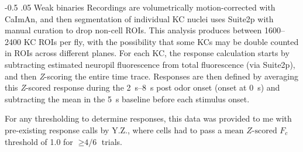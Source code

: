 \documentclass[12pt]{caltech_thesis}
\makeatletter
\let\Oldsubsubsection\subsubsection
\renewcommand{\subsubsection}{\FloatBarrier\Oldsubsubsection}
\renewcommand\paragraph{%
    \@startsection{paragraph}{4}{0mm}%
       {-0.5\baselineskip}%
       {.05\baselineskip}%
       {\normalfont\normalsize\itshape}}
\renewcommand\subsubsection{%
    \@startsection{subsubsection}{4}{0mm}%
       {-0.5\baselineskip}%
       {.05\baselineskip}%
       {\normalfont\normalsize\bfseries\itshape}}
\newcommand{\KCRespStat}{\ensuremath{\text{mean }\mathit{Z}\text{-scored $F_c$}}}
\makeatother
\begin{document}
\begin{refsection}
\paragraph{Weak binaries}
Recordings are volumetrically motion-corrected with CaImAn, and then segmentation of individual KC nuclei uses Suite2p with manual curation to drop non-cell ROIs.
This analysis produces between \numrange{1600}{2400} KC ROIs per fly, with the possibility that some KCs may be double counted in ROIs across different planes.
For each KC, the response calculation starts by subtracting estimated neuropil fluorescence from total fluorescence (via Suite2p), and then \textit{Z}-scoring the entire time trace.
Responses are then defined by averaging this \textit{Z}-scored response during the \qtyrange{2}{8}{\second} post odor onset (onset at \qty{0}{\second}) and subtracting the mean in the \qty{5}{\second} baseline before each stimulus onset.

For any thresholding to determine responses, this data was provided to me with pre-existing response calls by Y.Z., where cells had to pass a \KCRespStat{ }threshold of 1.0 for $\geq\text{4/6}$ trials.

\end{refsection}
\end{document}
